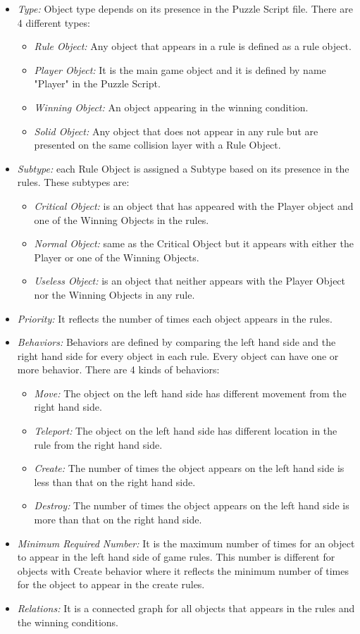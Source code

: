 \documentclass[letterpaper]{article}
\begin{document}
\begin{itemize}
	\item \emph{Type:} Object type depends on its presence in the Puzzle Script file. There are 4 different types:
	\begin{itemize}
		\item \emph{Rule Object:} Any object that appears in a rule is defined as a rule object.
		\item \emph{Player Object:} It is the main game object and it is defined by name "Player" in the Puzzle Script.
		\item \emph{Winning Object:} An object appearing in the winning condition.
		\item \emph{Solid Object:} Any object that does not appear in any rule but are presented on the same collision layer with a Rule Object.
	\end{itemize}
	\item \emph{Subtype:} each Rule Object is assigned a Subtype based on its presence in the rules. These subtypes are:
	\begin{itemize}
		\item \emph{Critical Object:} is an object that has appeared with the Player object and one of the Winning Objects in the rules.
		\item \emph{Normal Object:} same as the Critical Object but it appears with either the Player or one of the Winning Objects.
		\item \emph{Useless Object:} is an object that neither appears with the Player Object nor the Winning Objects in any rule.
	\end{itemize}
	\item \emph{Priority:} It reflects the number of times each object appears in the rules.
	\item \emph{Behaviors:} Behaviors are defined by comparing the left hand side and the right hand side for every object in each rule. Every object can have one or more behavior. There are 4 kinds of behaviors:
		\begin{itemize}
			\item \emph{Move:} The object on the left hand side has different movement from the right hand side.
			\item \emph{Teleport:} The object on the left hand side has different location in the rule from the right hand side.
			\item \emph{Create:} The number of times the object appears on the left hand side is less than that on the right hand side.
			\item \emph{Destroy:} The number of times the object appears on the left hand side is more than that on the right hand side.
		\end{itemize}
	\item \emph{Minimum Required Number:} It is the maximum number of times for an object to appear in the left hand side of game rules. This number is different for objects with Create behavior where it reflects the minimum number of times for the object to appear in the create rules.
	\item \emph{Relations:} It is a connected graph for all objects that appears in the rules and the winning conditions.
\end{itemize}
\end{document}
